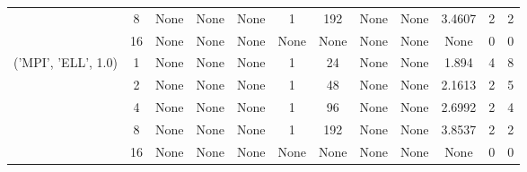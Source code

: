 \begin{tabular}{cccccccccccc}
& 8& None& None& None& 1& 192& None& None& 3.4607& 2& 2\\
& 16& None& None& None& None& None& None& None& None& 0& 0\\
\hline
\multirow{5}{*}{('MPI', 'ELL', 1.0)}& 1& None& None& None& 1& 24& None& None& 1.894& 4& 8\\
& 2& None& None& None& 1& 48& None& None& 2.1613& 2& 5\\
& 4& None& None& None& 1& 96& None& None& 2.6992& 2& 4\\
& 8& None& None& None& 1& 192& None& None& 3.8537& 2& 2\\
& 16& None& None& None& None& None& None& None& None& 0& 0\\
\hline
\end{tabular}




